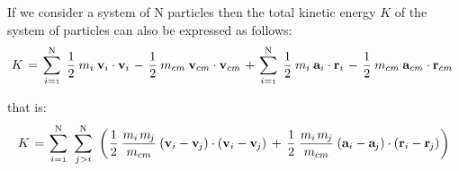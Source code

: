 \documentclass[10pt]{article}
\newcommand{\mM}{m}
\newcommand{\mK}{K}
\newcommand{\ri}{_i}
\newcommand{\rcm}{_{cm}}
\newcommand{\vR}{\mathbf{r}}
\newcommand{\vV}{\mathbf{v}}
\newcommand{\vA}{\mathbf{a}}
\newcommand{\rj}{_{\hspace{-0.081em}j}}
\begin{document}
\vspace{+0.90em}

\par If we consider a system of N particles then the total kinetic energy $\mK$ of the system of particles can also be expressed as follows:
\medskip
\begin{eqnarray*}
\hspace{-0.18em} \mK \hspace{+0.12em} = \hspace{+0.12em} \sum_{i={\scriptscriptstyle 1}}^{\mathrm N} \hspace{+0.27em} \frac{1}{2} \hspace{+0.24em} \mM\ri \hspace{+0.24em} \vV\ri \cdot \vV\ri \hspace{+0.12em} - \hspace{+0.12em} \frac{1}{2} \hspace{+0.24em} \mM\rcm \hspace{+0.24em} \vV\rcm \cdot \vV\rcm \hspace{+0.12em} + \hspace{+0.12em} \sum_{i={\scriptscriptstyle 1}}^{\mathrm N} \hspace{+0.27em} \frac{1}{2} \hspace{+0.24em} \mM\ri \hspace{+0.24em} \vA\ri \cdot \vR\ri \hspace{+0.12em} - \hspace{+0.12em} \frac{1}{2} \hspace{+0.24em} \mM\rcm \hspace{+0.24em} \vA\rcm \cdot \vR\rcm
\end{eqnarray*}
\smallskip
\par \noindent that is:
\medskip
\begin{eqnarray*}
\mK \hspace{+0.12em} = \hspace{+0.12em} \sum_{i={\scriptscriptstyle 1}}^{\mathrm N} \hspace{+0.36em} \sum_{j>i}^{\mathrm N} \hspace{+0.36em} \left( \hspace{+0.06em} \frac{1}{2} \hspace{+0.24em} \frac{\mM\ri \hspace{+0.12em} \mM\rj}{\mM\rcm} \hspace{+0.24em} (\vV\ri - \vV\rj) \cdot (\vV\ri - \vV\rj) \hspace{+0.18em} + \hspace{+0.18em} \frac{1}{2} \hspace{+0.24em} \frac{\mM\ri \hspace{+0.12em} \mM\rj}{\mM\rcm} \hspace{+0.24em} (\vA\ri - \vA\rj) \cdot (\vR\ri - \vR\rj) \hspace{+0.06em} \right)
\end{eqnarray*}
\end{document}
